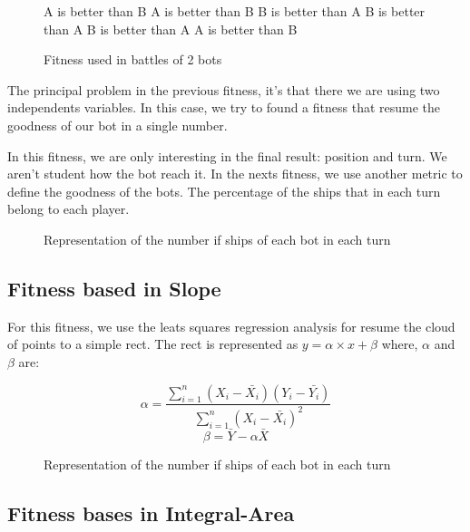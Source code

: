 \documentclass{llncs}
\begin{document}
\begin{figure}
\begin{algorithmic}
    	\State A is better than B
    	\State A is better than B
    \Else
    	\State B is better than A
    \EndIf
\Else
    	\State B is better than A
    	\State B is better than A
    \Else
    	\State A is better than B
    \EndIf
\EndIf
\end{algorithmic}
\caption{Fitness used in battles of 2 bots}
\label{fig:fitness_clasico}
\end{figure}



The principal problem in the previous fitness, it's that there we are using two independents variables. In this case, we try to found a fitness that resume the goodness of our bot in a single number. %

In this fitness, we are only interesting in the final result: position and turn. We aren't student how the bot reach it. In the nexts fitness, we use another metric to define the goodness of the bots. The percentage of the ships that in each turn belong to each player.

\begin{figure}
\begin{center}
\end{center}
\caption{Representation of the number if ships of each bot in each turn} 
\label{figura:nubecita}
\end{figure}

\subsection{Fitness based in Slope}

For this fitness, we use the leats squares regression analysis for resume the cloud of points to a simple rect. The rect is represented as {$y = \alpha \times x + \beta $} where, {$\alpha$} and {$\beta$} are:

\begin{figure}
	\begin{equation}
		\alpha = \frac{\sum_{i=1}^{n}(X_{i} - \bar{X_{i}})(Y_{i} - \bar{Y_{i}})}{\sum_{i=1}^{n}(X_{i} - \bar{X_{i}})^{2}}
	\end{equation}
	\begin{equation}
		\beta = \bar{Y}-\alpha\bar{X}
	\end{equation}
\end{figure}

\begin{figure}
\begin{center}
\end{center}
\caption{Representation of the number if ships of each bot in each turn} 
\label{figura:nubecita}
\end{figure}



\subsection{Fitness bases in Integral-Area}

\label{sec:fitness}
\end{document}

